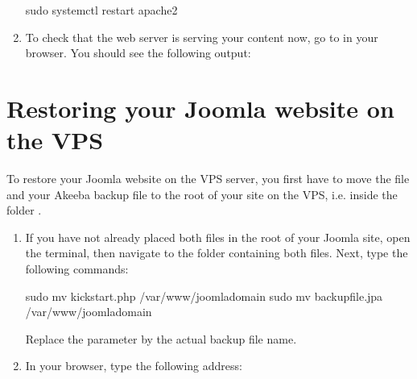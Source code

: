 \documentclass[a4paper,10pt,english,openany,oneside]{sphinxmanual}
\begin{document}
\begin{sloppypar}
\begin{enumerate}
\begin{sphinxVerbatim}[commandchars=\\\{\}]
\PYGZdl{} sudo systemctl restart apache2
\end{sphinxVerbatim}

\item {} 
\sphinxAtStartPar
To check that the web server is serving your content now, go to  in your browser. You should see the following output:
\begin{quote}

\sphinxAtStartPar
{}
\end{quote}

\end{enumerate}


\section{Restoring your Joomla website on the VPS}
\label{\detokenize{joomla-to-vps:restoring-your-joomla-website-on-the-vps}}
\sphinxAtStartPar
To restore your Joomla website on the VPS server, you first have to move the file  and your Akeeba backup file  to the root of your site on the VPS, i.e. inside the folder .
\begin{enumerate}
%
\item {} 
\sphinxAtStartPar
If you have not already placed both files in the root of your Joomla site, open the terminal, then navigate to the folder containing both files. Next, type the following commands:

\begin{sphinxVerbatim}[commandchars=\\\{\},numbers=left,firstnumber=1,stepnumber=1]
\PYGZdl{} sudo mv kickstart.php /var/www/joomla\PYGZhy{}domain
\PYGZdl{} sudo mv backup\PYGZhy{}file.jpa /var/www/joomla\PYGZhy{}domain
\end{sphinxVerbatim}

\sphinxAtStartPar
Replace the parameter  by the actual backup file name.

\item {} 
\sphinxAtStartPar
In your browser, type the following address:


\end{enumerate}
\end{sloppypar}
\end{document}
